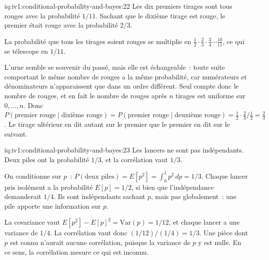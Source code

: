 \begin{solution}{iq:iv1:conditional-probability-and-bayes:22}
Les dix premiers tirages sont tous rouges avec la probabilité $1/11$. Sachant que le dixième tirage est rouge, le premier était rouge avec la probabilité $2/3$.

La probabilité que tous les tirages soient rouges se multiplie en $\tfrac12 \cdot \tfrac23 \cdot \tfrac34 \cdots \tfrac{10}{11}$, ce qui se télescope en $1/11$.

L'urne semble se souvenir du passé, mais elle est échangeable~: toute suite comportant le même nombre de rouges a la même probabilité, car numérateurs et dénominateurs n'apparaissent que dans un ordre différent. Seul compte donc le nombre de rouges, et en fait le nombre de rouges après $n$ tirages est uniforme sur $0, \dots, n$. Donc $P(\text{premier rouge} \mid \text{dixième rouge}) = P(\text{premier rouge} \mid \text{deuxième rouge}) = \tfrac12 \cdot \tfrac23 \big/ \tfrac12 = \tfrac23$. Le tirage ultérieur en dit autant sur le premier que le premier en dit sur le suivant.

\end{solution}

\begin{solution}{iq:iv1:conditional-probability-and-bayes:23}
Les lancers ne sont pas indépendants. Deux piles ont la probabilité $1/3$, et la corrélation vaut $1/3$.

On conditionne sur $p$~: $P(\text{deux piles}) = E[p^2] = \int_0^1 p^2 \, dp = 1/3$. Chaque lancer pris isolément a la probabilité $E[p] = 1/2$, si bien que l'indépendance demanderait $1/4$. Ils sont indépendants sachant $p$, mais pas globalement~: une pile apporte une information sur $p$.

La covariance vaut $E[p^2] - E[p]^2 = \mathrm{Var}(p) = 1/12$, et chaque lancer a une variance de $1/4$. La corrélation vaut donc $(1/12)/(1/4) = 1/3$. Une pièce dont $p$ est connu n'aurait aucune corrélation, puisque la variance de $p$ y est nulle. En ce sens, la corrélation mesure ce qui est inconnu.

\end{solution}

